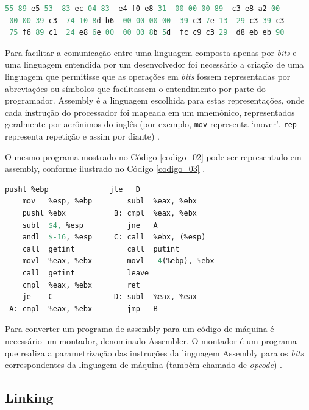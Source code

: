 \begin{lstlisting}[language=Pascal, caption={Algoritmo de 
									   Euclides Estendido, com adaptações},
                                                            label=codigo_02]
 55 89 e5 53  83 ec 04 83  e4 f0 e8 31  00 00 00 89  c3 e8 a2 00
 00 00 39 c3  74 10 8d b6  00 00 00 00  39 c3 7e 13  29 c3 39 c3
 75 f6 89 c1  24 e8 6e 00  00 00 8b 5d  fc c9 c3 29  d8 eb eb 90
\end{lstlisting}

Para facilitar a comunicação entre uma linguagem composta apenas por \textit{bits} e 
uma linguagem entendida por um desenvolvedor foi necessário a criação de uma
 linguagem que permitisse que as operações em \textit{bits} fossem representadas por 
abreviações ou símbolos que facilitassem o entendimento por parte do programador.
 Assembly é a linguagem escolhida para estas representações, onde cada 
instrução do processador foi mapeada em um mnemônico, representados geralmente 
por acrônimos do inglês (por exemplo, \texttt{mov} representa ‘mover’, \texttt{rep} 
representa repetição e assim por diante) \cite[pág. 5]{ref6}.

O mesmo programa mostrado no Código \ref{codigo_02} pode ser representado 
em assembly, conforme ilustrado no Código \ref{codigo_03} \cite[pág. 5]{ref6}. 

\begin{lstlisting}[language=Pascal,caption={Algoritmo de 
                                 Euclides estendido em Assembly , com adaptações},
                                                            label=codigo_03]
    pushl %ebp              jle   D
    mov   %esp, %ebp        subl  %eax, %ebx
    pushl %ebx           B: cmpl  %eax, %ebx   
    subl  $4, %esp          jne   A
    andl  $-16, %esp     C: call  %ebx, (%esp)
    call  getint            call  putint
    movl  %eax, %ebx        movl  -4(%ebp), %ebx
    call  getint            leave
    cmpl  %eax, %ebx        ret
    je    C              D: subl  %eax, %eax
 A: cmpl  %eax, %ebx        jmp   B

\end{lstlisting}

Para converter um programa de assembly para um código de máquina é necessário
 um montador, denominado Assembler. O montador é um programa que realiza a 
parametrização das instruções da linguagem Assembly para os \textit{bits} 
correspondentes da linguagem de máquina (também chamado de \textit{opcode}) \cite[pág. 6]{ref6}.

\subsection{Linking}


